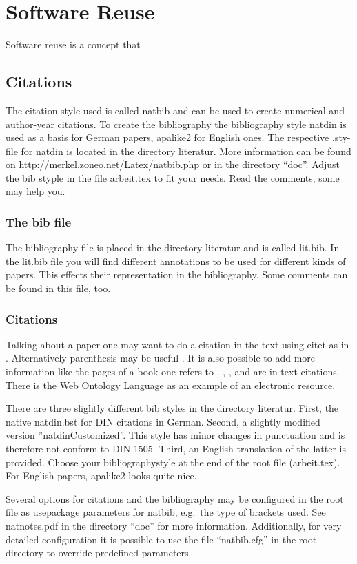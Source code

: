 \chapter{Software Reuse}
\label{chap:sw-reuse}

Software reuse is a concept that

\section{Citations}
\label{sec:citations}

The citation style used is called natbib and can be used to create numerical and author-year citations. To create the bibliography the bibliography style natdin is used as a basis for German papers, apalike2 for English ones. The respective .sty-file for natdin is located in the directory literatur. More information can be found on \url{http://merkel.zoneo.net/Latex/natbib.php} or in the directory ``doc''. Adjust the bib styple in the file arbeit.tex to fit your needs. Read the comments, some may help you. 

\subsection{The bib file}
\label{subsec:theBibFile}

The bibliography file is placed in the directory literatur and is called lit.bib. In the lit.bib file you will find different annotations to be used for different kinds of papers. This effects their representation in the bibliography. Some comments can be found in this file, too.

\subsection{Citations}
\label{subsec:citations}

Talking about a paper one may want to do a citation in the text using citet as in \citet{COMITY}. Alternatively parenthesis may be useful \citep{tannenbaum}. It is also possible to add more information like the pages of a book one refers to \citep[pp. 222-333]{tannenbaum}. \citet{ECORA}, \citet{random}, \citet{habil} and \citet{master} are in text citations. There is the Web Ontology Language  \citep{OWL} as an example of an electronic resource.

There are three slightly different bib styles in the directory literatur. First, the native natdin.bst for DIN citations in German. Second, a slightly modified version ''natdinCustomized''. This style has minor changes in punctuation and is therefore not conform to DIN 1505. Third, an English translation of the latter is provided. Choose your bibliographystyle at the end of the root file (arbeit.tex). For English papers, apalike2 looks quite nice.

Several options for citations and the bibliography may be configured in the root file as usepackage parameters for natbib, e.g.\ the type of brackets used. See natnotes.pdf in the directory ``doc'' for more information. Additionally, for very detailed configuration it is possible to use the file ``natbib.cfg'' in the root directory to override predefined parameters.